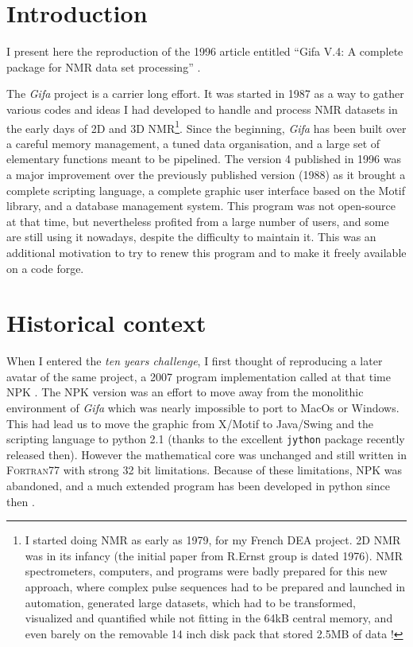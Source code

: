 \hypertarget{introduction}{%
\section{Introduction}\label{introduction}}

I present here the reproduction of the 1996 article entitled ``Gifa V.4: A
complete package for NMR data set processing'' \cite{Pons_1996}.

The \emph{Gifa} project is a carrier long effort. It was started in 1987
as a way to gather various codes and ideas I had developed to handle
and process NMR datasets in the early days of 2D and 3D NMR\footnote{I
  started doing NMR as early as 1979, for my French DEA project. 2D NMR
  was in its infancy (the initial paper from R.Ernst group is dated
  1976). NMR spectrometers, computers, and programs were badly prepared
  for this new approach, where complex pulse sequences had to be
  prepared and launched in automation, generated large datasets, which
  had to be transformed, visualized and quantified while not fitting in
  the 64kB central memory, and even barely on the removable 14 inch disk
  pack that stored 2.5MB of data !}. Since the beginning, \emph{Gifa}
has been built over a careful memory management, a tuned data
organisation, and a large set of elementary functions meant to be
pipelined. The version 4 published in 1996 was a major improvement over
the previously published version (1988) as it brought a complete scripting
language, a complete graphic user interface based on the Motif library,
and a database management system. This program was not open-source at
that time, but nevertheless profited from a large number of users, and
some are still using it nowadays, despite the difficulty to maintain it.
This was an additional motivation to try to renew this program and to
make it freely available on a code forge.

\hypertarget{Historical-context}{%
\section{Historical context}\label{Historical-context}}
When I entered the \emph{ten years challenge}, I first thought of
reproducing a later avatar of the same project, a 2007 program
implementation called at that time NPK \cite{Tramesel_2007}. The NPK
version was an effort to move away from the monolithic environment of
\emph{Gifa} which was nearly impossible to port to MacOs or Windows.
This had lead us to move the graphic from X/Motif to Java/Swing and the
scripting language to python 2.1 (thanks to the excellent
\texttt{jython} package recently released then). However the
mathematical core was unchanged and still written in F\textsc{ortran}77
with strong 32 bit limitations. Because of these limitations, NPK was
abandoned, and a much extended program has been developed in python
since then \cite{Spike2016}.

